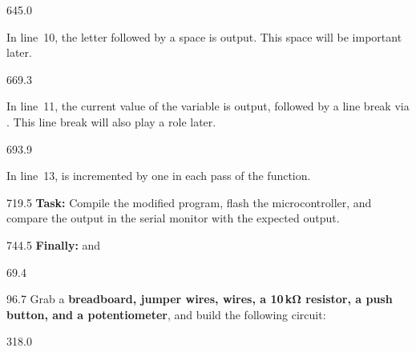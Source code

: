 \documentclass{aslab}
\begin{document}
\begin{region}[pitch=12.7,free]{645.0}
\begin{dashlist}
\item In line~10, the letter  followed by a space is output. This
  space will be important later.
\end{dashlist}
\end{region}

\begin{region}[pitch=12.9]{669.3}
\begin{dashlist}
\item In line~11, the current value of the variable  is
  output, followed by a line break via . This line break will
  also play a role later.
\end{dashlist}
\end{region}

\begin{region}[free]{693.9}
\begin{dashlist}
\item In line~13,  is incremented by one in each pass of the
   function.
\end{dashlist}
\end{region}

\begin{region}[pitch=12.1]{719.5}
\textbf{Task:} Compile the modified program, flash the microcontroller, and
compare the output in the serial monitor with the expected output.
\end{region}

\begin{region}{744.5}
\textbf{Finally:}  and 
\end{region}

\nextpage
\begin{region}{69.4}
\end{region}

\begin{region}[pitch=13]{96.7}
Grab a \textbf{breadboard, jumper wires, wires, a 10\,kΩ resistor, a push
button, and a potentiometer}, and build the following circuit:
\end{region}


\begin{region}{318.0}
\end{region}
\end{document}
